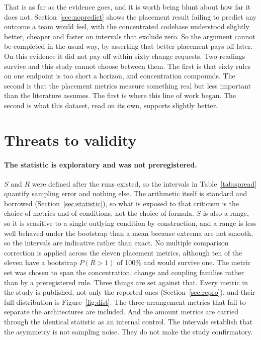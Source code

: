 \documentclass[11pt,a4paper]{article}
\begin{document}
That is as far as the evidence goes, and it is worth being blunt about how far it
does not. Section~\ref{sec:nopredict} shows the placement result failing to
predict any outcome a team would feel, with the concentrated codebase understood
slightly better, cheaper and faster on intervals that exclude zero. So the
argument cannot be completed in the usual way, by asserting that better placement
pays off later. On this evidence it did not pay off within sixty change requests.
Two readings survive and this study cannot choose between them. The first is that
sixty rules on one endpoint is too short a horizon, and concentration compounds.
The second is that the placement metrics measure something real but less important
than the literature assumes. The first is where this line of work began. The
second is what this dataset, read on its own, supports slightly better.

\section{Threats to validity}
\label{sec:threats}

\paragraph{The statistic is exploratory and was not preregistered.} $S$ and $R$
were defined after the runs existed, so the intervals in Table~\ref{tab:spread}
quantify sampling error and nothing else. The arithmetic itself is standard and
borrowed (Section~\ref{sec:statistic}), so what is exposed to that criticism is
the choice of metrics and of conditions, not the choice of formula. $S$ is also a
range, so it is sensitive to a single outlying condition by construction, and a
range is less well behaved under the bootstrap than a mean because extrema are
not smooth, so the intervals are indicative rather than exact. No multiple
comparison correction is applied across the eleven placement metrics, although
ten of the eleven have a bootstrap $P(R>1)$ of 100\% and would survive one. The
metric set was chosen to span the concentration, change and coupling families
rather than by a preregistered rule. Three things are set against that. Every
metric in the study is published, not only the reported ones
(Section~\ref{sec:repro}), and their full distribution is Figure~\ref{fig:dist}.
The three arrangement metrics that fail to separate the architectures are
included. And the amount metrics are carried through the identical statistic as an
internal control. The intervals establish that the asymmetry is not sampling
noise. They do not make the study confirmatory.
\end{document}
